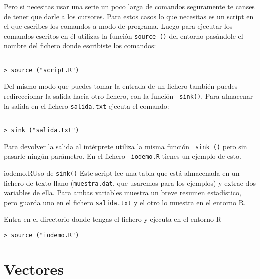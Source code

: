 Pero si necesitas usar una serie un poco larga de comandos seguramente
te canses de tener  que darle a los cursores. Para  estos casos lo que
necesitas  es un  script en  el que  escribes los  comandos a  modo de
programa. Luego para ejecutar los  comandos escritos en él utilizas la
función {\tt  source ()} del  entorno pasándole el nombre  del fichero
donde escribiste los comandos:


\begin{verbatim}

> source ("script.R")

\end{verbatim}

Del  mismo modo  que puedes  tomar la  entrada de  un fichero  también
puedes redireccionar la salida hacia otro fichero, con la función {\tt
sink()}. Para almacenar la salida en el fichero {\tt salida.txt} 
ejecuta el comando:


\begin{verbatim}

> sink ("salida.txt")

\end{verbatim}

Para devolver  la salida al  intérprete utiliza la misma  función {\tt
sink  ()}  pero sin  pasarle  ningún  parámetro.  En el  fichero  {\tt
iodemo.R}  tienes un  ejemplo de  esto. 

\begin{ejemplo}{iodemo.R}{Uso de {\tt sink()}}
Este script lee  una tabla que está almacenada en  un fichero de texto
llano ({\tt muestra.dat}, que usaremos para los ejemplos) y extrae dos
variables  de ella.  Para  ambas variables  muestra  un breve  resumen
estadístico, pero guarda uno en el  fichero {\tt salida.txt} y el otro
lo muestra en el entorno {\sf R}.
\end{ejemplo}

Entra en el directorio donde tengas el fichero y ejecuta en el entorno
{\sf R}

\begin{verbatim}
> source ("iodemo.R")
\end{verbatim}

\section{Vectores}

